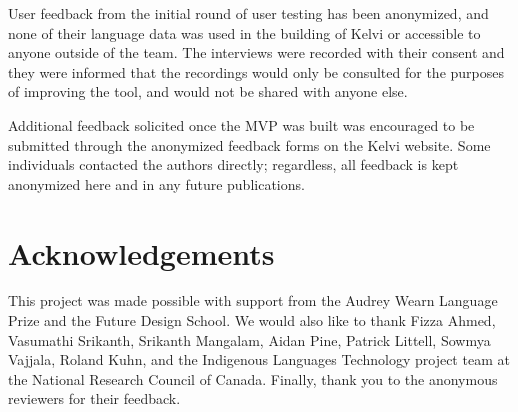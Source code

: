 \documentclass[11pt]{article}
\begin{document}
User feedback from the initial round of user testing has been anonymized, and 
none of their language data was used in the building of Kelvi or accessible to anyone outside of the team. 
The interviews were recorded with their consent and they were informed that the recordings would only be 
consulted for the purposes of improving the tool, and would not be shared with anyone else.

Additional feedback solicited once the MVP was built was encouraged to be submitted through the 
anonymized feedback forms on the Kelvi website. 
Some individuals contacted the authors directly; regardless, all feedback is kept anonymized here and in any future publications.

\section{Acknowledgements}
This project was made possible with support from the Audrey Wearn Language Prize and the Future Design School. We would also like to thank Fizza Ahmed, Vasumathi Srikanth, Srikanth Mangalam, Aidan Pine, Patrick Littell, Sowmya Vajjala, Roland Kuhn, and the Indigenous Languages Technology project team at the National Research Council of Canada. Finally, thank you to the anonymous reviewers for their feedback.









\appendix
\end{document}
